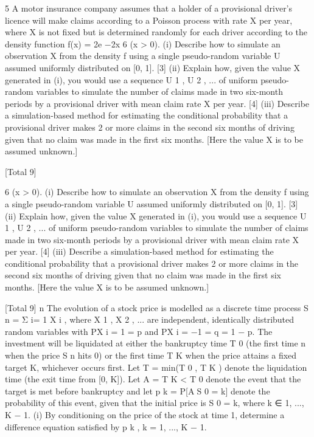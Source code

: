 

5
A motor insurance company assumes that a holder of a provisional driver’s
licence will make claims according to a Poisson process with rate X per year,
where X is not fixed but is determined randomly for each driver according to the
density function
f(x) = 2e −2x
6
(x > 0).
(i) Describe how to simulate an observation X from the density f using a
single pseudo-random variable U assumed uniformly distributed on [0, 1].
[3]
(ii) Explain how, given the value X generated in (i), you would use a sequence
U 1 , U 2 , ... of uniform pseudo-random variables to simulate the number of
claims made in two six-month periods by a provisional driver with mean
claim rate X per year.
[4]
(iii) Describe a simulation-based method for estimating the conditional
probability that a provisional driver makes 2 or more claims in the second
six months of driving given that no claim was made in the first six
months. [Here the value X is to be assumed unknown.]

[Total 9]

6
(x > 0).
(i) Describe how to simulate an observation X from the density f using a
single pseudo-random variable U assumed uniformly distributed on [0, 1].
[3]
(ii) Explain how, given the value X generated in (i), you would use a sequence
U 1 , U 2 , ... of uniform pseudo-random variables to simulate the number of
claims made in two six-month periods by a provisional driver with mean
claim rate X per year.
[4]
(iii) Describe a simulation-based method for estimating the conditional
probability that a provisional driver makes 2 or more claims in the second
six months of driving given that no claim was made in the first six
months. [Here the value X is to be assumed unknown.]

[Total 9]
n
The evolution of a stock price is modelled as a discrete time process S n = Σ i=
1 X i ,
where X 1 , X 2 , ... are independent, identically distributed random variables with
P{X i = 1} = p and P{X i = −1} = q = 1 − p. The investment will be liquidated at
either the bankruptcy time T 0 (the first time n when the price S n hits 0) or the
first time T K when the price attains a fixed target K, whichever occurs first.
Let T = min(T 0 , T K ) denote the liquidation time (the exit time from [0, K]). Let
A = {T K < T 0 } denote the event that the target is met before bankruptcy and let
p k = P[AS 0 = k] denote the probability of this event, given that the initial price is
S 0 = k, where k ∈ {1, ..., K − 1}.
(i) By conditioning on the price of the stock at time 1, determine a difference
equation satisfied by p k , k = 1, ..., K − 1.

